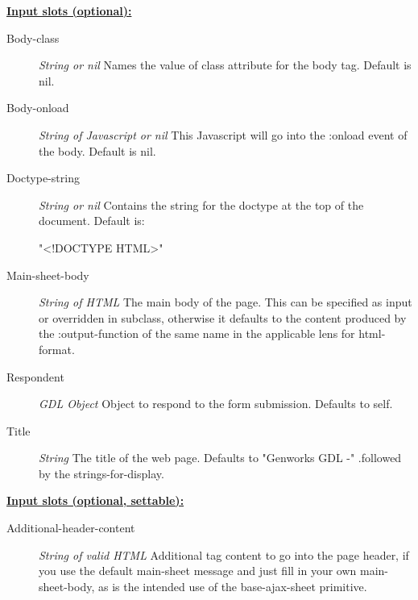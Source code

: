 \documentclass [11pt]{book}
\begin{document}
\begin{itemize}
\begin{description}
\end{description}








\textbf{
\underline{Input slots (optional):}}

\begin{description}

\item [Body-class]
\emph{String or nil} Names the value of class attribute for the body tag. Default is nil.


\item [Body-onload]
\emph{String of Javascript or nil} This Javascript will go into the :onload event of the body.
Default is nil.


\item [Doctype-string]
\emph{String or nil} Contains the string for the doctype at the top of the document. Default is:

"<!DOCTYPE HTML>"


\item [Main-sheet-body]
\emph{String of HTML} The main body of the page.
This can be specified as input or overridden in subclass, otherwise it defaults
to the content produced by the :output-function of the same name
in the applicable lens for  html-format.


\item [Respondent]
\emph{GDL Object} Object to respond to the form submission. Defaults to self.


\item [Title]
\emph{String} The title of the web page. Defaults to "Genworks GDL -"
.followed by the strings-for-display.


\end{description}






\textbf{
\underline{Input slots (optional, settable):}}

\begin{description}

\item [Additional-header-content]
\emph{String of valid HTML} Additional tag content to go into the page header,
if you use the default main-sheet message and just fill in your own main-sheet-body, as
is the intended use of the base-ajax-sheet primitive.



\end{description}
\end{itemize}
\end{document}

